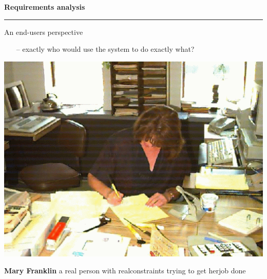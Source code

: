 \documentclass[pdf]{beamer}
\begin{document}
\begin{frame}
\vspace{8mm}
\textcolor{myBlue}{\textbf{\Large{Requirements analysis}}}

\textcolor{red}{\rule{10cm}{1mm}}	

An end-users perspective
    \begin{itemize}
      \item [--]exactly who would use the system to do exactly what?     
    \end{itemize}
    
	\begin{minipage}[t]{0.28\linewidth}  
      \bigskip
      \includegraphics[scale=0.5]{6_Picture6.png}
  	\end{minipage}
\hfill
\begin{minipage}[t]{0.57\linewidth}   
\bigskip
\bigskip
\bigskip
\bigskip
\LARGE \textbf{Mary Franklin} \newline
\normalsize{a real person with real\newline constraints trying to get her\newline job done}
\end{minipage}           
\end{frame}
\end{document}
